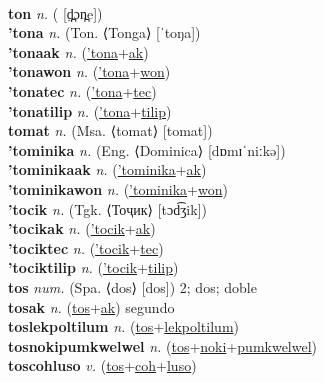  \label{tolmiki} \\
\textbf{ton} \textit{n.} ( [d̪̤ɔn̪e])
 \label{ton} \\
\textbf{'tona} \textit{n.} (Ton. ⟨Tonga⟩ [ˈtoŋa])
 \label{'tona} \\
\textbf{'tonaak} \textit{n.} (\hyperref['tona]{'tona}+\hyperref[ak]{ak})
 \label{'tonaak} \\
\textbf{'tonawon} \textit{n.} (\hyperref['tona]{'tona}+\hyperref[won]{won})
 \label{'tonawon} \\
\textbf{'tonatec} \textit{n.} (\hyperref['tona]{'tona}+\hyperref[tec]{tec})
 \label{'tonatec} \\
\textbf{'tonatilip} \textit{n.} (\hyperref['tona]{'tona}+\hyperref[tilip]{tilip})
 \label{'tonatilip} \\
\textbf{tomat} \textit{n.} (Msa. ⟨tomat⟩ [tomat])
 \label{tomat} \\
\textbf{'tominika} \textit{n.} (Eng. ⟨Dominica⟩ [dɒmɪˈniːkə])
 \label{'tominika} \\
\textbf{'tominikaak} \textit{n.} (\hyperref['tominika]{'tominika}+\hyperref[ak]{ak})
 \label{'tominikaak} \\
\textbf{'tominikawon} \textit{n.} (\hyperref['tominika]{'tominika}+\hyperref[won]{won})
 \label{'tominikawon} \\
\textbf{'tocik} \textit{n.} (Tgk. ⟨Тоҷик⟩ [tɔd͡ʒik])
 \label{'tocik} \\
\textbf{'tocikak} \textit{n.} (\hyperref['tocik]{'tocik}+\hyperref[ak]{ak})
 \label{'tocikak} \\
\textbf{'tociktec} \textit{n.} (\hyperref['tocik]{'tocik}+\hyperref[tec]{tec})
 \label{'tociktec} \\
\textbf{'tociktilip} \textit{n.} (\hyperref['tocik]{'tocik}+\hyperref[tilip]{tilip})
 \label{'tociktilip} \\
\textbf{tos} \textit{num.} (Spa. ⟨dos⟩ [dos])
2; dos; doble \label{tos} \\
\textbf{tosak} \textit{n.} (\hyperref[tos]{tos}+\hyperref[ak]{ak})
segundo \label{tosak} \\
\textbf{toslekpoltilum} \textit{n.} (\hyperref[tos]{tos}+\hyperref[lekpoltilum]{lekpoltilum})
 \label{toslekpoltilum} \\
\textbf{tosnokipumkwelwel} \textit{n.} (\hyperref[tos]{tos}+\hyperref[noki]{noki}+\hyperref[pumkwelwel]{pumkwelwel})
 \label{tosnokipumkwelwel} \\
\textbf{toscohluso} \textit{v.} (\hyperref[tos]{tos}+\hyperref[coh]{coh}+\hyperref[luso]{luso})
 \label{toscohluso} \\
